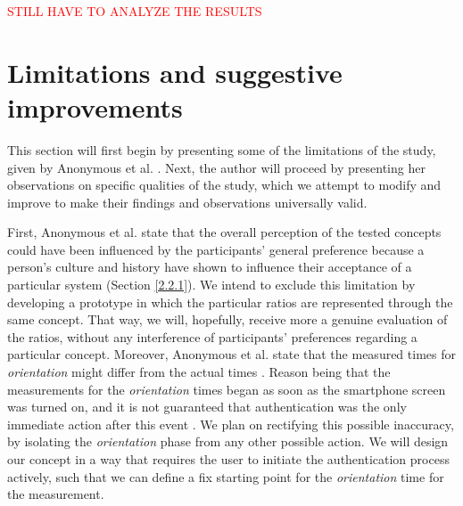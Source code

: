 \textcolor{red}{STILL HAVE TO ANALYZE THE RESULTS}

\section{Limitations and suggestive improvements}

This section will first begin by presenting some of the limitations of the study, given by Anonymous et al. \cite{anonymous}. Next, the author will proceed by presenting her observations on specific qualities of the study, which we attempt to modify and improve to make their findings and observations universally valid.  

First, Anonymous et al. \cite{anonymous} state that the overall perception of the tested concepts could have been influenced by the participants' general preference \cite{anonymous} because a person's culture and history have shown to influence their acceptance of a particular system \cite{Harbach:2016} (Section \ref{2.2.1}). We intend to exclude this limitation by developing a prototype in which the particular ratios are represented through the same concept. That way, we will, hopefully, receive more a genuine evaluation of the ratios, without any interference of participants' preferences regarding a particular concept. Moreover, Anonymous et al. \cite{anonymous} state that the measured times for \textit{orientation} might differ from the actual times \cite{anonymous}. Reason being that the measurements for the \textit{orientation} times began as soon as the smartphone screen was turned on, and it is not guaranteed that authentication was the only immediate action after this event \cite{anonymous}. We plan on rectifying this possible inaccuracy, by isolating the \textit{orientation} phase from any other possible action. We will design our concept in a way that requires the user to initiate the authentication process actively, such that we can define a fix starting point for the \textit{orientation} time for the measurement.\\

